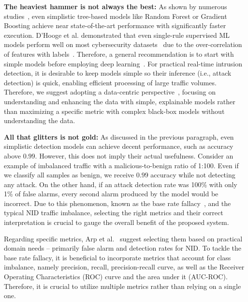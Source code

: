 \textbf{The heaviest hammer is not always the best:} As shown by numerous studies~\cite{apruzzese2022_sok_unlabeled_data,zhang2022_comparative_nids_ml,vinayakumar2019_dnn_ids}, even simplistic tree-based models like Random Forest or Gradient Boosting achieve near state-of-the-art performance with significantly faster execution. D'Hooge et al. demonstrated that even single-rule supervised ML models perform well on most cybersecurity datasets~\cite{dhooge2023_castles} due to the over-correlation of features with labels~\cite{silva2022_netsec_datasets_bias}. Therefore, a general recommendation is to start with simple models before employing deep learning~\cite{catillo2023_ml_public_ids_datasets}. For practical real-time intrusion detection, it is desirable to keep models simple so their inference (i.e., attack detection) is quick, enabling efficient processing of large traffic volumes. Therefore, we suggest adopting a data-centric perspective~\cite{zha2025_datacentric_survey}, focusing on understanding and enhancing the data with simple, explainable models rather than maximizing a specific metric with complex black-box models without understanding the data.

\textbf{All that glitters is not gold:} As discussed in the previous paragraph, even simplistic detection models can achieve decent performance, such as accuracy above $0.99$. However, this does not imply their actual usefulness. Consider an example of imbalanced traffic with a malicious-to-benign ratio of 1:100. Even if we classify all samples as benign, we receive $0.99$ accuracy while not detecting any attack. On the other hand, if an attack detection rate was 100\% with only 1\% of false alarms, every second alarm produced by the model would be incorrect. Due to this phenomenon, known as the base rate fallacy~\cite{axelsson1999_base_rate_fallacy_ids,alahmadi2022_99fp_study_soc_alarms}, and the typical NID traffic imbalance, selecting the right metrics and their correct interpretation is crucial to gauge the overall benefit of the proposed system.

Regarding specific metrics, Arp et al.~\cite{arp2022_dos_donts_ml_security} suggest selecting them based on practical domain needs -- primarily false alarm and detection rates for NID. To tackle the base rate fallacy, it is beneficial to incorporate metrics that account for class imbalance, namely precision, recall, precision-recall curve, as well as the Receiver Operating Characteristics (ROC) curve and the area under it (AUC-ROC). Therefore, it is crucial to utilize multiple metrics rather than relying on a single one.

